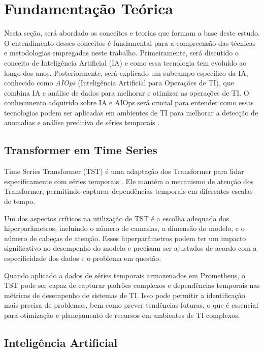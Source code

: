 \chapter{Fundamentação Teórica}
\label{cap_fundamentacao-teorica}

Nesta seção, será abordado os conceitos e teorias que formam a base deste estudo. O entendimento desses conceitos é fundamental para a compreensão das técnicas e metodologias empregadas neste trabalho. Primeiramente, será discutido o conceito de Inteligência Artificial (IA) e como essa tecnologia tem evoluído ao longo dos anos. Posteriormente, será explicado um subcampo específico da IA, conhecido como \textit{AIOps} (Inteligência Artificial para Operações de TI), que combina IA e análise de dados para melhorar e otimizar as operações de TI. O conhecimento adquirido sobre IA e AIOps será crucial para entender como essas tecnologias podem ser aplicadas em ambientes de TI para melhorar a detecção de anomalias e análise preditiva de séries temporais \cite{russell2016artificial, gardner2017artificial}.

\section{Transformer em Time Series}

Time Series Transformer (TST) é uma adaptação dos Transformer para lidar especificamente com séries temporais \cite{lim2019temporal}. Ele mantém o mecanismo de atenção dos Transformer, permitindo capturar dependências temporais em diferentes escalas de tempo.

Um dos aspectos críticos na utilização de TST é a escolha adequada dos hiperparâmetros, incluindo o número de camadas, a dimensão do modelo, e o número de cabeças de atenção. Esses hiperparâmetros podem ter um impacto significativo no desempenho do modelo e precisam ser ajustados de acordo com a especificidade dos dados e o problema em questão.

Quando aplicado a dados de séries temporais armazenados em Prometheus, o TST pode ser capaz de capturar padrões complexos e dependências temporais nas métricas de desempenho de sistemas de TI. Isso pode permitir a identificação mais precisa de problemas, bem como prever tendências futuras, o que é essencial para otimização e planejamento de recursos em ambientes de TI complexos.




\section{Inteligência Artificial}

